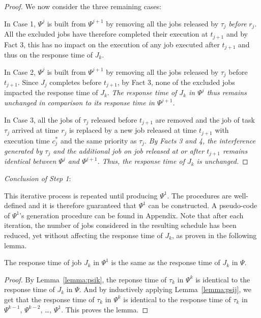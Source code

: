 \begin{proof}
We now consider the three remaining cases:

\noindent In Case 1, $\Psi^j$ is built from $\Psi^{j+1}$ by removing all the jobs released by $\tau_j$ \emph{before} $r_j$.  All the excluded jobs have therefore completed their execution at $t_{j+1}$ and by Fact 3, this has no impact on the execution of any job executed after $t_{j+1}$ and thus on the response time of $J_k$.

\noindent In Case 2, $\Psi^j$ is built from $\Psi^{j+1}$ by removing all the jobs released by $\tau_j$ before $t_{j+1}$. Since $J_{j}$ completes before $t_{j+1}$, by Fact 3, none of the excluded jobs impacted the response time of $J_k$. \emph{The response time of $J_{k}$ in $\Psi^j$ thus remains unchanged in comparison to its response time in $\Psi^{j+1}$.}

\noindent In Case 3, all the jobs of $\tau_j$ released before $t_{j+1}$ are removed and the job of task $\tau_j$ arrived at time $r_j$ is replaced by a new job released at time $t_{j+1}$ with execution time $c_j^*$ and the same priority as $\tau_j$. \emph{By Facts 3 and 4, the interference generated by $\tau_j$ and the additional job on job released at or after $t_{j+1}$ remains identical between $\Psi^j$ and $\Psi^{j+1}$. Thus, the response time of $J_k$ is unchanged.} 
\end{proof}

 
\noindent\textit{Conclusion of Step 1}:

This iterative process is repeated until producing $\Psi^1$. The procedures are well-defined and it is therefore guaranteed that $\Psi^1$ can be constructed. A pseudo-code of $\Psi^1$'s generation procedure can be found in Appendix\citetechreport{}. Note that after each iteration, the number of jobs considered in the resulting schedule has been reduced, yet without affecting the response time of $J_k$, as proven in the following lemma.

 \begin{Lemma}
\label{lem:step-1-conclusion}
 The response time of job $J_k$ in $\Psi^1$ is the same as the response time of $J_k$ in $\Psi$.
\end{Lemma}
\begin{proof}
  By Lemma~\ref{lemma:psik}, the reponse time of $\tau_k$ in $\Psi^k$ is identical to the response time of $J_k$ in $\Psi$. And by inductively applying Lemma~\ref{lemma:psij}, we get that the response time of $\tau_k$ in $\Psi^k$ is identical to the response time of $\tau_k$ in $\Psi^{k-1}$, $\Psi^{k-2}$, \ldots, $\Psi^{1}$. This proves the lemma.
\end{proof}


